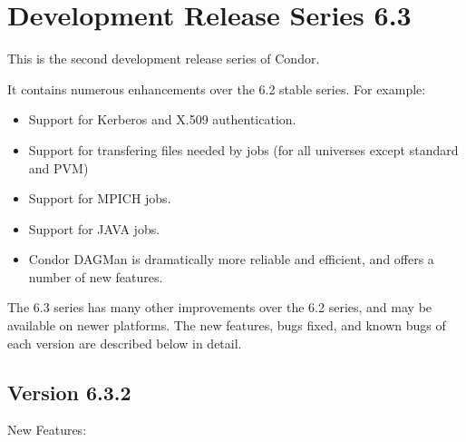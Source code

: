 \section{\label{sec:History-6-3}Development Release Series 6.3}

This is the second development release series of Condor.

It contains numerous enhancements over the 6.2 stable series.
For example:

\begin{itemize}

\item Support for Kerberos and X.509 authentication.

\item Support for transfering files needed by jobs (for all universes
except standard and PVM)

\item Support for MPICH jobs.

\item Support for JAVA jobs.

\item 
Condor DAGMan is dramatically more reliable and efficient, and offers
a number of new features.

\end{itemize}

The 6.3 series has many other improvements over the 6.2 series, and
may be available on newer platforms.  The new features, bugs fixed,
and known bugs of each version are described below in detail.


\subsection{\label{sec:New-6-3-2}Version 6.3.2}

\noindent New Features:

